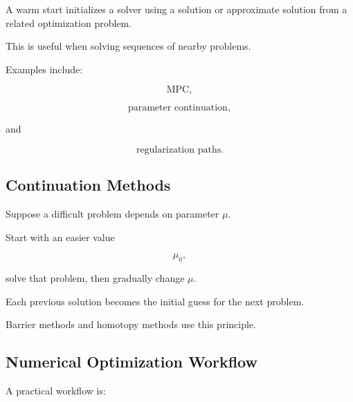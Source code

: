 A warm start initializes a solver using a solution or approximate solution
from a related optimization problem.

This is useful when solving sequences of nearby problems.

Examples include:

\[
\boxed{
\text{MPC},
}
\]

\[
\boxed{
\text{parameter continuation},
}
\]

and

\[
\boxed{
\text{regularization paths}.
}
\]

\subsection{Continuation Methods}
\label{subsec:optimization-continuation}

Suppose a difficult problem depends on parameter \(\mu\).

Start with an easier value

\[
\mu_0,
\]

solve that problem, then gradually change \(\mu\).

Each previous solution becomes the initial guess for the next problem.

Barrier methods and homotopy methods use this principle.

\subsection{Numerical Optimization Workflow}
\label{subsec:numerical-optimization-workflow}

A practical workflow is:

